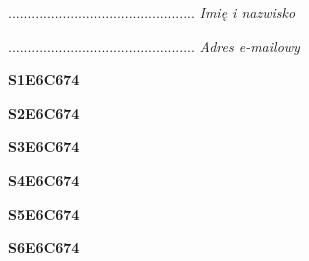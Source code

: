 \begin{turn}{90}\begin{minipage}{\linewidth} \vspace{20mm} ................................................  \textit{Imię i nazwisko}\end{minipage}\end{turn}

\begin{turn}{90}\begin{minipage}{\linewidth} \vspace{20mm} ................................................  \textit{Adres e-mailowy}\end{minipage}\end{turn}

\begin{turn}{90}\huge \begin{minipage}{\linewidth} \vspace{10mm}\textbf{S1E6C674}\end{minipage}\end{turn}

\begin{turn}{90}\huge \begin{minipage}{\linewidth} \vspace{10mm}\textbf{S2E6C674}\end{minipage}\end{turn}

\begin{turn}{90}\huge \begin{minipage}{\linewidth} \vspace{10mm}\textbf{S3E6C674}\end{minipage}\end{turn}

\begin{turn}{90}\huge \begin{minipage}{\linewidth} \vspace{10mm}\textbf{S4E6C674}\end{minipage}\end{turn}

\begin{turn}{90}\huge \begin{minipage}{\linewidth} \vspace{10mm}\textbf{S5E6C674}\end{minipage}\end{turn}

\begin{turn}{90}\huge \begin{minipage}{\linewidth} \vspace{10mm}\textbf{S6E6C674}\end{minipage}\end{turn}

